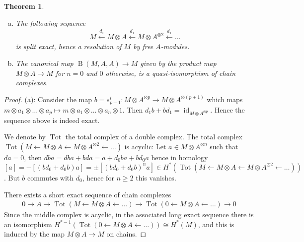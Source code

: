 \documentclass{scrartcl}
\let\emph\relax
\newcommand{\emphi}[1]{\index{#1}\emph{#1}}
\theoremstyle{plain}
\newtheorem{theorem}{Theorem}[section]
\theoremstyle{definition}
\newtheorem{definition}[theorem]{Definition}
\DeclareMathOperator{\Tot}{Tot}
\newcommand{\iso}{\cong}
\newcommand{\from}{\leftarrow}
\let\xfrom\xleftarrow
\DeclareMathOperator{\id}{id}
\DeclareMathOperator{\BC}{B}
\begin{document}
\begin{theorem}\label{thm:bar_resolution}
    \begin{enumerate}[(a)]
        \item The following sequence 
    \begin{align*}
        M \xfrom{d_1} M\otimes A\xfrom{d_1} M\otimes A^{\otimes 2} \xfrom{d_1} \dots
    \end{align*}
    is split exact, hence a resolution of $M$ by free $A$-modules. 

    \item The canonical map $\BC(M, A, A)\to M$ given by the product map $M\otimes A\to M$ for $n=0$ and $0$ otherwise, is a quasi-isomorphism of chain complexes. 
\end{enumerate}
\end{theorem}
\begin{proof}
    (a): Consider the map $b=s^i_{p-1}\colon M\otimes A^{\otimes p}\to M\otimes A^{\otimes (p+1)}$ which maps $m\otimes a_1\otimes\dots\otimes a_p\mapsto m\otimes a_1\otimes\dots\otimes a_n\otimes 1$. Then $d_1 b + b d_1 = \id_{M\otimes A^{\otimes p}}$. Hence the sequence above is indeed exact. 

    \item We denote by $\Tot$ the total complex of a double complex. The total complex $\Tot(M\from M\otimes A\from M\otimes A^{\otimes 2}\from \dots)$ is acyclic: Let $a\in M\otimes A^{\otimes n}$ such that $da = 0$, then $dba = dba + bda = a + d_0 ba + bd_0 a$ hence in homology $[a]=-[(bd_0+d_0b)a] = \pm[(bd_0+d_0b)^n a]\in H^*(\Tot(M\from M\otimes A\from M\otimes A^{\otimes 2}\from \dots))$. But $b$ commutes with $d_0$, hence for $n\geq 2$ this vanishes. 
  
    There exists a short exact sequence of chain complexes
    \begin{align*}
        0\to A\to \Tot(M\from M\otimes A\from \dots) \to \Tot(0 \from M\otimes A \from\dots) \to 0
    \end{align*}
    Since the middle complex is acyclic, in the associated long exact sequence there is an isomorphism $H^{*-1}(\Tot(0\from M\otimes A \from \dots))\iso H^*(M)$, and this is induced by the map $M\otimes A\to M$ on chains.
\end{proof}

\end{document}
